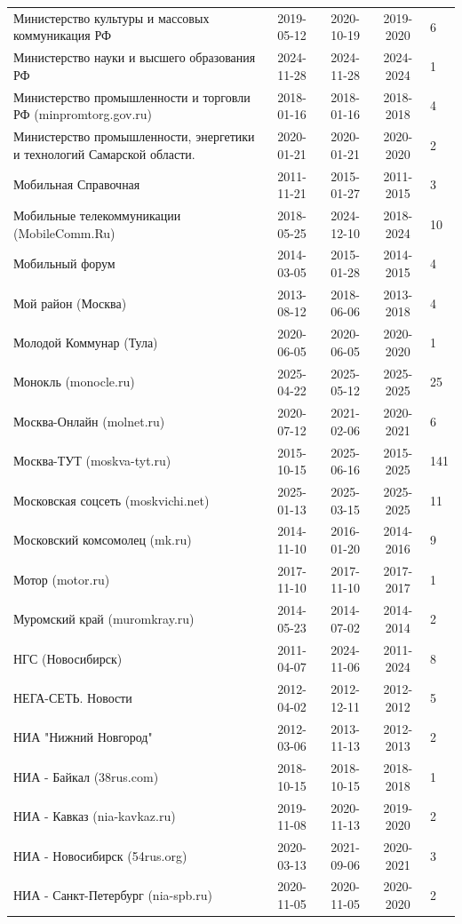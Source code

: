 \begin{longtable}{p{6cm}cccp{2cm}}
Министерство культуры и массовых коммуникация РФ & 2019-05-12 & 2020-10-19 & 2019-2020 & 6\\
Министерство науки и высшего образования РФ & 2024-11-28 & 2024-11-28 & 2024-2024 & 1\\
Министерство промышленности и торговли РФ (minpromtorg.gov.ru) & 2018-01-16 & 2018-01-16 & 2018-2018 & 4\\
Министерство промышленности, энергетики и технологий Самарской области. & 2020-01-21 & 2020-01-21 & 2020-2020 & 2\\
Мобильная Справочная & 2011-11-21 & 2015-01-27 & 2011-2015 & 3\\
Мобильные телекоммуникации (MobileComm.Ru) & 2018-05-25 & 2024-12-10 & 2018-2024 & 10\\
Мобильный форум & 2014-03-05 & 2015-01-28 & 2014-2015 & 4\\
Мой район (Москва) & 2013-08-12 & 2018-06-06 & 2013-2018 & 4\\
Молодой Коммунар (Тула) & 2020-06-05 & 2020-06-05 & 2020-2020 & 1\\
Монокль (monocle.ru) & 2025-04-22 & 2025-05-12 & 2025-2025 & 25\\
Москва-Онлайн (molnet.ru) & 2020-07-12 & 2021-02-06 & 2020-2021 & 6\\
Москва-ТУТ (moskva-tyt.ru) & 2015-10-15 & 2025-06-16 & 2015-2025 & 141\\
Московская соцсеть (moskvichi.net) & 2025-01-13 & 2025-03-15 & 2025-2025 & 11\\
Московский комсомолец (mk.ru) & 2014-11-10 & 2016-01-20 & 2014-2016 & 9\\
Мотор (motor.ru) & 2017-11-10 & 2017-11-10 & 2017-2017 & 1\\
Муромский край (muromkray.ru) & 2014-05-23 & 2014-07-02 & 2014-2014 & 2\\
НГС (Новосибирск) & 2011-04-07 & 2024-11-06 & 2011-2024 & 8\\
НЕГА-СЕТЬ. Новости & 2012-04-02 & 2012-12-11 & 2012-2012 & 5\\
НИА "Нижний Новгород" & 2012-03-06 & 2013-11-13 & 2012-2013 & 2\\
НИА - Байкал (38rus.com) & 2018-10-15 & 2018-10-15 & 2018-2018 & 1\\
НИА - Кавказ (nia-kavkaz.ru) & 2019-11-08 & 2020-11-13 & 2019-2020 & 2\\
НИА - Новосибирск (54rus.org) & 2020-03-13 & 2021-09-06 & 2020-2021 & 3\\
НИА - Санкт-Петербург (nia-spb.ru) & 2020-11-05 & 2020-11-05 & 2020-2020 & 2\\

\end{longtable}
